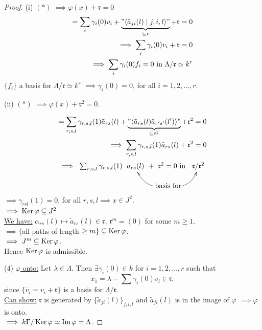\begin{proof}
(i) $(*)$ $\implies \varphi(x) + \mathfrak{r} = 0$ 
\begin{equation*}
\begin{split}
= \sum_i \gamma_i(0) v_i + \underbrace{"\langle \tilde{a}_{ji}(l) \mid j, i, l \rangle"}_{\subseteq \mathfrak{r}} + \mathfrak{r} = 0\\
\implies \sum_i \gamma_i(0)v_i + \mathfrak{r} = 0\\
\implies \sum_i \gamma_i(0)f_i = 0 \text{ in } \Lambda / \mathfrak{r} \simeq k^r
\end{split}
\end{equation*}
$\{ f_i \}$ a basis for $\Lambda / \mathfrak{r} \simeq k^r$ $\implies
\gamma_i(0) = 0$, for all $i = 1, 2, \ldots, r$. 

(ii) $(*)$ $\implies \varphi(x) + \mathfrak{r}^2 = 0.$


\begin{equation*}
\begin{split}
= \sum_{r,s,l} \gamma_{r,s,l}(1)\tilde{a}_{rs}(l) + \underbrace{"\langle \tilde{a}_{rs}(l)\tilde{a}_{r's'}(l') \rangle"}_{\subseteq \mathfrak{r}^2} + \mathfrak{r}^2 = 0\\
\implies \sum_{r,s,l} \gamma_{r,s,l}(1)\tilde{a}_{rs}(l) + \mathfrak{r}^2 = 0\\
\implies \xymatrix@C-2pc@R-1pc{
\sum_{r,s,l} \gamma_{r,s,l}(1) & a_{rs}(l) & +\;\;\mathfrak{r}^2 = 0 \text{ in } & \mathfrak{r} / \mathfrak{r}^2\\
&& \text{basis for} \ar@/^1pc/[ul] \ar@/_1pc/[ur]&
}
\end{split}
\end{equation*}
$\implies \gamma_{rsl}(1) = 0$, for all $r, s, l \implies x \in J^2$.\\
$\implies \operatorname{Ker}\nolimits \varphi \subseteq J^2$.\\
\underline{We have:} $\alpha_{rs}(l) \mapsto \tilde{a}_{rs}(l) \in
\mathfrak{r}$, $\mathfrak{r}^m = (0)$ for some $m \geq 1$.\\ 
$\implies \{ $all paths of length $\geq m \} \subseteq \operatorname{Ker}\nolimits \varphi$.\\
$\implies J^m \subseteq \operatorname{Ker}\nolimits \varphi $.\\
Hence $\operatorname{Ker}\nolimits\varphi$ is admissible. 

(4) \underline{$\varphi$ onto:} Let $\lambda \in \Lambda$. Then
$\exists \gamma_i(0) \in k$ for $i = 1, 2, \ldots , r$ such that  
\[ x_1 = \lambda - \sum \gamma_i(0)v_i \in \mathfrak{r},\]
since $\{ \overline{v}_i = v_i + \mathfrak{r} \}$ is a basis for $\Lambda/\mathfrak{r}$.\\
\underline{Can show:} $\mathfrak{r}$ is generated by $\{ \tilde{a}_{ji}(l) \}_{j,i,l}$ and $\tilde{a}_{ji}(l)$ is in the image of $\varphi$ $\implies \varphi$ is onto.\\
$\implies k\Gamma/ \operatorname{Ker}\nolimits \varphi \simeq \operatorname{Im}\nolimits \varphi = \Lambda$. 
\end{proof}


